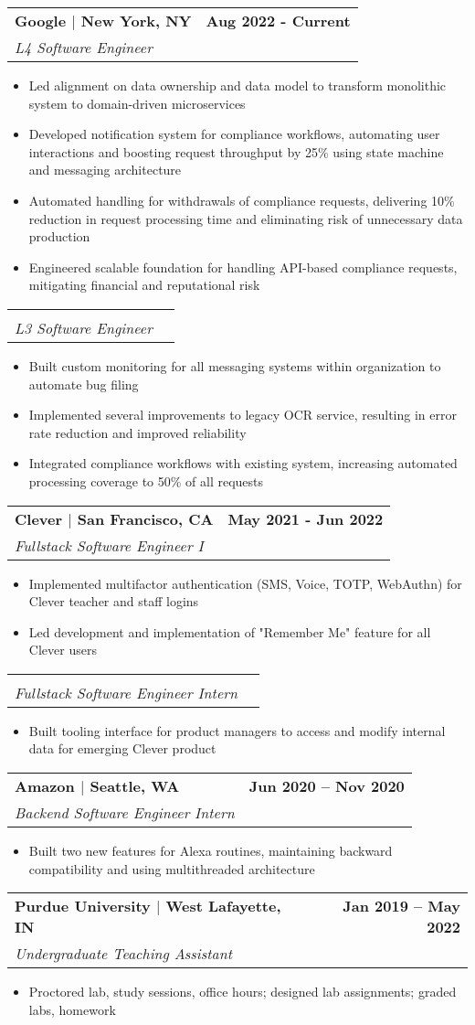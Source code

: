 \documentclass[letterpaper,11pt]{article}
\makeatletter
\newcommand{\resumeItem}[1]{
  \item\small{
    {#1 \vspace{-2pt}}
  }
}
\newcommand{\resumeSubheading}[4]{
  \vspace{-2pt}\item
    \begin{tabular*}{1.0\textwidth}[t]{l@{\extracolsep{\fill}}r}
      \textbf{#1} & \textbf{\small #2} \\
      \textit{\small#3} & \textit{\small #4} \\
    \end{tabular*}\vspace{-7pt}
}
\newcommand{\resumeItemListStart}{\begin{itemize}}
\newcommand{\resumeItemListEnd}{\end{itemize}\vspace{-5pt}}
\makeatother
\begin{document}
    \resumeSubheading
      {Google $|$ New York, NY}{Aug 2022 - Current}
      {L4 Software Engineer}{}
      \resumeItemListStart
        \resumeItem{Led alignment on data ownership and data model to transform monolithic system to domain-driven microservices}
        \resumeItem{Developed notification system for compliance workflows, automating user interactions and boosting request throughput by 25\% using state machine and messaging architecture}
        \resumeItem{Automated handling for withdrawals of compliance requests, delivering 10\% reduction in request processing time and eliminating risk of unnecessary data production}
        \resumeItem{Engineered scalable foundation for handling API-based compliance requests, mitigating financial and reputational risk}
      \resumeItemListEnd
    \vspace{-20pt}
    \resumeSubheading
      {}{}
      {L3 Software Engineer}{}
      \resumeItemListStart
        \resumeItem{Built custom monitoring for all messaging systems within organization to automate bug filing}
        \resumeItem{Implemented several improvements to legacy OCR service, resulting in error rate reduction and improved reliability}
        \resumeItem{Integrated compliance workflows with existing system, increasing automated processing coverage to 50\% of all requests}
      \resumeItemListEnd
      
    \resumeSubheading
      {Clever $|$ San Francisco, CA}{May 2021 - Jun 2022}
      {Fullstack Software Engineer I}{}
      \resumeItemListStart
        \resumeItem{Implemented multifactor authentication (SMS, Voice, TOTP, WebAuthn) for Clever teacher and staff logins}
        \resumeItem{Led development and implementation of "Remember Me" feature for all Clever users}
     \resumeItemListEnd
     \vspace{-15pt}
     \resumeSubheading
      {}{}
      {Fullstack Software Engineer Intern}{}
     \resumeItemListStart
        \resumeItem{Built tooling interface for product managers to access and modify internal data for emerging Clever product}
    \resumeItemListEnd
    

    \resumeSubheading
      {Amazon $|$ Seattle, WA}{Jun 2020 -- Nov 2020}
      {Backend Software Engineer Intern}{}
    \resumeItemListStart
        \resumeItem{Built two new features for Alexa routines, maintaining backward compatibility and using multithreaded architecture}
    \resumeItemListEnd
    \resumeSubheading
      {Purdue University $|$ West Lafayette, IN}{Jan 2019 -- May 2022}
      {Undergraduate Teaching Assistant}{}
    \resumeItemListStart
        \resumeItem{Proctored lab, study sessions, office hours; designed lab assignments; graded labs, homework}
    \resumeItemListEnd
    
\end{document}

